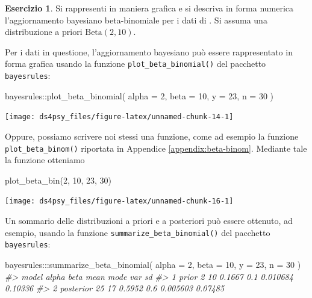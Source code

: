 \documentclass[
  11pt,
]{krantz}
\makeatletter
\newenvironment{Shaded}{\begin{snugshade}}{\end{snugshade}}
\newcommand{\AttributeTok}[1]{\textcolor[rgb]{0.61,0.61,0.61}{#1}}
\newcommand{\CommentTok}[1]{\textcolor[rgb]{0.37,0.37,0.37}{\textit{#1}}}
\newcommand{\DecValTok}[1]{\textcolor[rgb]{0.06,0.06,0.06}{#1}}
\newcommand{\FunctionTok}[1]{\textcolor[rgb]{0,0,0}{#1}}
\newcommand{\NormalTok}[1]{#1}
\newcommand{\SpecialCharTok}[1]{\textcolor[rgb]{0,0,0}{#1}}
\newenvironment{kframe}{%
\medskip{}
\setlength{\fboxsep}{.8em}
 \def\at@end@of@kframe{}%
 \ifinner\ifhmode%
  \def\at@end@of@kframe{\end{minipage}}%
  \begin{minipage}{\columnwidth}%
 \fi\fi%
 \def\FrameCommand##1{\hskip\@totalleftmargin \hskip-\fboxsep
 \colorbox{shadecolor}{##1}\hskip-\fboxsep
     \hskip-\linewidth \hskip-\@totalleftmargin \hskip\columnwidth}%
 \MakeFramed {\advance\hsize-\width
   \@totalleftmargin\z@ \linewidth\hsize
   \@setminipage}}%
 {\par\unskip\endMakeFramed%
 \at@end@of@kframe}
\renewenvironment{Shaded}{\begin{kframe}}{\end{kframe}}
\theoremstyle{definition}
\theoremstyle{definition}
\theoremstyle{definition}
\newtheorem{exercise}{Esercizio}[chapter]
\theoremstyle{definition}
\theoremstyle{remark}
\makeatother
\begin{document}
\begin{exercise}

Si rappresenti in maniera grafica e si descriva in forma numerica l'aggiornamento bayesiano beta-binomiale per i dati di \citet{zetschefuture2019}. Si assuma una distribuzione a priori \(\mbox{Beta}(2, 10)\).

Per i dati in questione, l'aggiornamento bayesiano può essere rappresentato in forma grafica usando la funzione \texttt{plot\_beta\_binomial()} del pacchetto \texttt{bayesrules}:

\begin{Shaded}
\begin{Highlighting}[]
\NormalTok{bayesrules}\SpecialCharTok{::}\FunctionTok{plot\_beta\_binomial}\NormalTok{(}
  \AttributeTok{alpha =} \DecValTok{2}\NormalTok{, }\AttributeTok{beta =} \DecValTok{10}\NormalTok{, }\AttributeTok{y =} \DecValTok{23}\NormalTok{, }\AttributeTok{n =} \DecValTok{30}
\NormalTok{  ) }
\end{Highlighting}
\end{Shaded}

\begin{center}\texttt{[image: ds4psy\_files/figure-latex/unnamed-chunk-14-1]} \end{center}

Oppure, possiamo scrivere noi stessi una funzione, come ad esempio la funzione \texttt{plot\_beta\_binom()} riportata in Appendice \ref{appendix:beta-binom}. Mediante tale la funzione otteniamo

\begin{Shaded}
\begin{Highlighting}[]
\FunctionTok{plot\_beta\_bin}\NormalTok{(}\DecValTok{2}\NormalTok{, }\DecValTok{10}\NormalTok{, }\DecValTok{23}\NormalTok{, }\DecValTok{30}\NormalTok{)}
\end{Highlighting}
\end{Shaded}

\begin{center}\texttt{[image: ds4psy\_files/figure-latex/unnamed-chunk-16-1]} \end{center}

Un sommario delle distribuzioni a priori e a posteriori può essere ottenuto, ad esempio, usando la funzione \texttt{summarize\_beta\_binomial()} del pacchetto \texttt{bayesrules}:

\begin{Shaded}
\begin{Highlighting}[]
\NormalTok{bayesrules}\SpecialCharTok{:::}\FunctionTok{summarize\_beta\_binomial}\NormalTok{(}
  \AttributeTok{alpha =} \DecValTok{2}\NormalTok{, }\AttributeTok{beta =} \DecValTok{10}\NormalTok{, }\AttributeTok{y =} \DecValTok{23}\NormalTok{, }\AttributeTok{n =} \DecValTok{30}
\NormalTok{)}
\CommentTok{\#\textgreater{}       model alpha beta   mean mode      var      sd}
\CommentTok{\#\textgreater{} 1     prior     2   10 0.1667  0.1 0.010684 0.10336}
\CommentTok{\#\textgreater{} 2 posterior    25   17 0.5952  0.6 0.005603 0.07485}
\end{Highlighting}
\end{Shaded}

\end{exercise}
\end{document}
